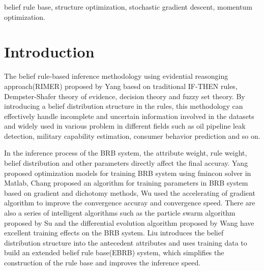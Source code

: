 \documentclass{ieeeaccess}
\begin{document}
\begin{keywords}
    belief rule base, structure optimization, stochastic gradient descent, momentum optimization.
\end{keywords}

\titlepgskip=-15pt

\maketitle

\section{Introduction}
\label{sec:introduction}

The belief rule-based inference methodology using evidential reasonging approach(RIMER) proposed by Yang\cite{a1}
baesd on traditional IF-THEN rules\cite{a2}, Dempster-Shafer theory of evidence\cite{a3,a4}, decision theory\cite{a5}
and fuzzy set theory\cite{a6}. By introducing a belief distribution structure in the rules, this methodology can
effectively handle incomplete and uncertain information involved in the datasets and widely used in various problem in
different fields such as oil pipeline leak detection\cite{a7}, military capability estimation\cite{a8}, consumer behavior
prediction\cite{a9} and so on.

In the inference process of the BRB system, the attribute weight, rule weight, belief distribution and other parameters
directly affect the final accuray. Yang\cite{a10} proposed optimization models for training BRB system using fmincon solver in
Matlab, Chang\cite{a11,a12} proposed an algorithm for training parameters in BRB system based on gradient and dichotomy methods,
Wu\cite{a13} used the accelerating of gradient algorithm to improve the convergence accuray and convergence speed. There are also
a series of intelligent algorithms such as the particle swarm algorithm proposed by Su\cite{a14} and the differential evolution
algorithm proposed by Wang\cite{a15} have excellent training effects on the BRB system. Liu\cite{a16} introduces the belief distribution
structure into the antecedent attributes and uses training data to build an extended belief rule base(EBRB) system, which simplifies the construction of
the rule base and improves the inference speed.
\end{document}
